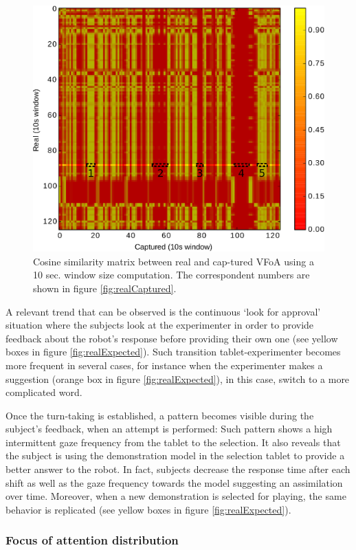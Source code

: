 \documentclass{sig-alternate}
\begin{document}
\begin{figure}[h!]
    \centering
    \includegraphics[width=0.7\columnwidth]{bitmap}
    \caption{\small Cosine similarity matrix between real and cap-tured VFoA
    using a 10 sec. window size computation. The correspondent numbers are shown
    in figure \ref{fig:realCaptured}.}
    \label{fig:bitmap}
\end{figure}

A relevant trend that can be observed is the continuous `look for approval'
situation where the subjects look at the experimenter in order to provide
feedback about the robot's response before providing their own one (see yellow
boxes in figure \ref{fig:realExpected}). Such transition tablet-experimenter
becomes more frequent in several cases, for instance when the experimenter makes
a suggestion (orange box in figure \ref{fig:realExpected}), in this case, switch
to a more complicated word.

Once the turn-taking is established, a pattern becomes visible during the
subject's feedback, when an attempt is performed: Such pattern shows a high
intermittent gaze frequency from the tablet to the selection. It also reveals
that the subject is using the demonstration model in the selection tablet to
provide a better answer to the robot. In fact, subjects decrease the response
time after each shift as well as the gaze frequency towards the model suggesting
an assimilation over time. Moreover, when a new demonstration is selected for
playing, the same behavior is replicated (see yellow boxes in figure
\ref{fig:realExpected}).

\subsubsection{Focus of attention distribution}
\end{document}
